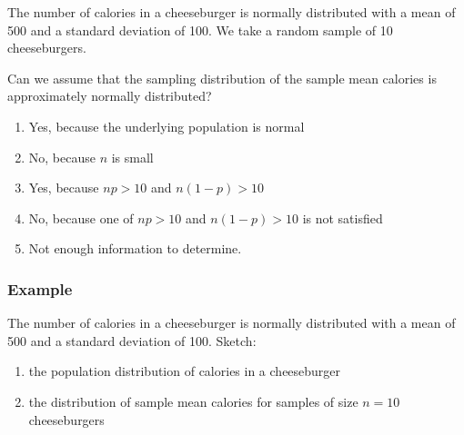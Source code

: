 \begin{frame}
The number of calories in a cheeseburger is normally distributed with a mean of 500 and a standard deviation of 100.  We take a random sample of 10 cheeseburgers.
\begin{clicker}
{Can we assume that the sampling distribution of the sample mean calories is approximately normally distributed?}
\begin{enumerate}
   \item
   Yes, because the underlying population is normal
   \item
   No, because $n$ is small
   \item
   Yes, because $np>10$ and $n(1-p)>10$
   \item
   No, because one of $np>10$ and $n(1-p)>10$ is not satisfied
   \item
   Not enough information to determine.
  \end{enumerate}
\end{clicker}
\end{frame}


\begin{frame}
\frametitle{Example}
The number of calories in a cheeseburger is normally distributed with a mean of 500 and a standard deviation of 100.  Sketch:
\begin{enumerate}
\item the population distribution of calories in a cheeseburger
\item the distribution of sample mean calories for samples of size $n=10$ cheeseburgers
\end{enumerate}
\vskip200pt
\end{frame}



